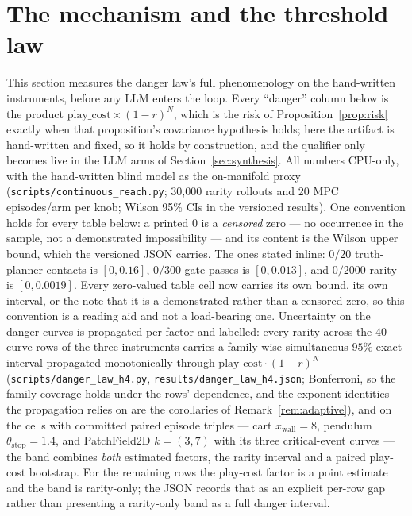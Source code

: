 \documentclass[11pt]{article}
\theoremstyle{definition}
\theoremstyle{remark}
\begin{document}
\section{The mechanism and the threshold law}
\label{sec:mechanism}

This section measures the danger law's full phenomenology on the hand-written instruments, before any LLM enters the loop. Every ``danger'' column below is the product $\mathrm{play\_cost} \times (1-r)^N$, which is the risk of Proposition~\ref{prop:risk} exactly when that proposition's covariance hypothesis holds; here the artifact is hand-written and fixed, so it holds by construction, and the qualifier only becomes live in the LLM arms of Section~\ref{sec:synthesis}. All numbers CPU-only, with the hand-written blind model as the on-manifold proxy (\texttt{scripts/continuous\_reach.py}; 30{,}000 rarity rollouts and 20 MPC episodes/arm per knob; Wilson 95\% CIs \citep{wilson1927} in the versioned results). One convention holds for every table below: a printed $0$ is a \emph{censored} zero --- no occurrence in the sample, not a demonstrated impossibility --- and its content is the Wilson upper bound, which the versioned JSON carries. The ones stated inline: $0/20$ truth-planner contacts is $[0, 0.16]$, $0/300$ gate passes is $[0, 0.013]$, and $0/2000$ rarity is $[0, 0.0019]$. Every zero-valued table cell now carries its own bound, its own interval, or the note that it is a demonstrated rather than a censored zero, so this convention is a reading aid and not a load-bearing one. Uncertainty on the danger curves is propagated per factor and labelled: every rarity across the $40$ curve rows of the three instruments carries a family-wise simultaneous $95\%$ exact interval propagated monotonically through $\mathrm{play\_cost} \cdot (1-r)^N$ (\texttt{scripts/\allowbreak danger\_\allowbreak law\_\allowbreak h4.py}, \texttt{results/\allowbreak danger\_\allowbreak law\_\allowbreak h4.json}; Bonferroni, so the family coverage holds under the rows' dependence, and the exponent identities the propagation relies on are the corollaries of Remark~\ref{rem:adaptive}), and on the cells with committed paired episode triples --- cart $x_\mathrm{wall}=8$, pendulum $\theta_\mathrm{stop}=1.4$, and PatchField2D $k=(3,7)$ with its three critical-event curves --- the band combines \emph{both} estimated factors, the rarity interval and a paired play-cost bootstrap. For the remaining rows the play-cost factor is a point estimate and the band is rarity-only; the JSON records that as an explicit per-row gap rather than presenting a rarity-only band as a full danger interval.
\end{document}
